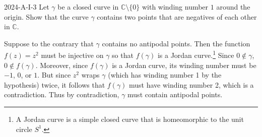 \documentclass{article}
\begin{document}
	\begin{prb}{2024-A-I-3}
		Let $\gamma$ be a closed curve in $\mathbb{C}\setminus \{0\}$ with winding number $1$ around the origin. Show that the curve $\gamma$ contains two points that are negatives of each other in $\mathbb{C}$. 
	\end{prb}
	Suppose to the contrary that $\gamma$ contains no antipodal points. Then the function $f(z) = z^2$ must be injective on $\gamma$ so that $f(\gamma)$ is a Jordan curve.\footnote{A Jordan curve is a simple closed curve that is homeomorphic to the unit circle $S^1$.} Since $0 \notin \gamma$, $0 \notin f(\gamma)$. Moreover, since $f(\gamma)$ is a Jordan curve, its winding number must be $-1$, $0$, or $1$. But since $z^2$ wraps $\gamma$ (which has winding number 1 by the hypothesis) twice, it follows that $f(\gamma)$ must have winding number 2, which is a contradiction. Thus by contradiction, $\gamma$ must contain antipodal points. 
	
\end{document}
